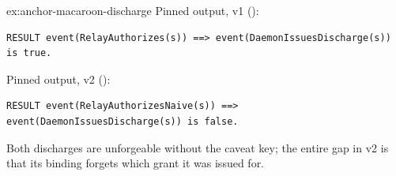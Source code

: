 \documentclass[11pt,a4paper]{article}
\theoremstyle{definition}
\begin{document}
\begin{pdsolution}{ex:anchor-macaroon-discharge}
Pinned output, v1 ():
\begin{lstlisting}
RESULT event(RelayAuthorizes(s)) ==> event(DaemonIssuesDischarge(s)) is true.
\end{lstlisting}
Pinned output, v2 ():
\begin{lstlisting}
RESULT event(RelayAuthorizesNaive(s)) ==> event(DaemonIssuesDischarge(s)) is false.
\end{lstlisting}
Both discharges are unforgeable without the caveat key; the entire gap in v2 is that its binding forgets which grant it was issued for.
\end{pdsolution}

\pdprintsolutions
\end{document}
